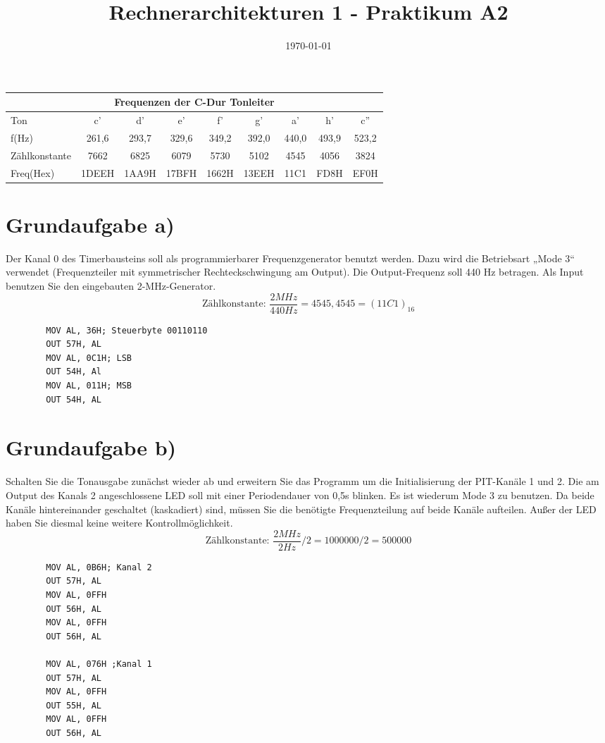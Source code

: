 \documentclass[10pt, a4paper]{report}
\title{Rechnerarchitekturen 1 - Praktikum A2}
\author{}
\date\today
\begin{document}
\begin{center}
        \begin{tabular}{| l | c | c | c | c | c | c | c | c | }
                \hline
                \multicolumn{9}{|c|}{Frequenzen der C-Dur Tonleiter}\\
                \hline
                \hline
                Ton   & c'    & d'    & e'    & f'    & g'    & a'    & h'    & c''   \\\hline
                f(Hz) & 261,6 & 293,7 & 329,6 & 349,2 & 392,0 & 440,0 & 493,9 & 523,2 \\\hline
                Zählkonstante & 7662 & 6825 & 6079 & 5730 & 5102 & 4545 & 4056 & 3824 \\\hline
                Freq(Hex) & 1DEEH & 1AA9H & 17BFH & 1662H & 13EEH & 11C1 & FD8H & EF0H\\\hline
        \end{tabular}
\end{center}

\section*{ Grundaufgabe a)}
\scriptsize{Der  Kanal  0  des  Timerbausteins  soll  als  programmierbarer  Frequenzgenerator  benutzt  werden.  Dazu  wird  die  Betriebsart  „Mode  3“  verwendet  (Frequenzteiler  mit  symmetrischer  Rechteckschwingung  am  Output).  Die  Output-Frequenz  soll  440  Hz  betragen. Als Input benutzen Sie den eingebauten 2-MHz-Generator.}
$$\text{Zählkonstante: } \frac{2 MHz}{440 Hz} = 4545,4545 = (11C1)_{16}$$
\begin{lstlisting}
        MOV AL, 36H; Steuerbyte 00110110
        OUT 57H, AL
        MOV AL, 0C1H; LSB
        OUT 54H, Al
        MOV AL, 011H; MSB
        OUT 54H, AL
\end{lstlisting}


\section*{ Grundaufgabe b)}
\scriptsize{Schalten  Sie  die  Tonausgabe  zunächst  wieder  ab  und  erweitern  Sie  das  Programm  um  die  Initialisierung der PIT-Kanäle 1 und 2. Die am Output des Kanals 2 angeschlossene LED soll mit  einer  Periodendauer  von  0,5s  blinken.  Es  ist  wiederum  Mode  3  zu  benutzen.  Da  beide  Kanäle hintereinander geschaltet (kaskadiert) sind, müssen Sie die benötigte Frequenzteilung auf beide Kanäle aufteilen. Außer der LED haben Sie diesmal keine weitere Kontrollmöglichkeit. }
$$\text{Zählkonstante: } \frac{2 MHz}{2 Hz} /2 = 1000000 / 2 = 500000$$
\begin{lstlisting}
        MOV AL, 0B6H; Kanal 2
        OUT 57H, AL
        MOV AL, 0FFH
        OUT 56H, AL
        MOV AL, 0FFH
        OUT 56H, AL

        MOV AL, 076H ;Kanal 1
        OUT 57H, AL
        MOV AL, 0FFH
        OUT 55H, AL
        MOV AL, 0FFH
        OUT 56H, AL

\end{lstlisting}
\clearpage
\end{document}
